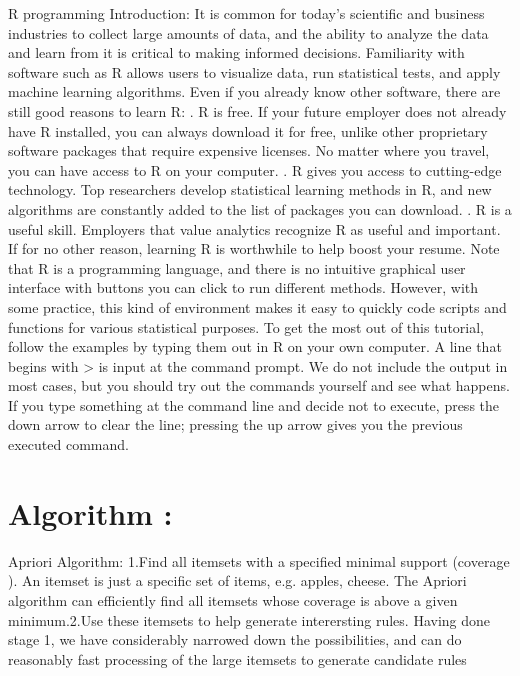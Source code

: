 \documentclass[10pt,a4paper]{article}
\begin{document}
{{R programming Introduction:
\newline
It is common for today's scientific and business industries to collect large amounts of data, and the ability to
analyze the data and learn from it is critical to making informed decisions. Familiarity with software such as R
allows users to visualize data, run statistical tests, and apply machine learning algorithms. Even if you already
know other software, there are still good reasons to learn R:
.	 R is free. If your future employer does not already have R installed, you can always download it for free,
unlike other proprietary software packages that require expensive licenses. No matter where you travel, you
can have access to R on your computer.
.	 R gives you access to cutting-edge technology. Top researchers develop statistical learning methods
in R, and new algorithms are constantly added to the list of packages you can download.
.	 R is a useful skill. Employers that value analytics recognize R as useful and important. If for no other
reason, learning R is worthwhile to help boost your resume.
\newline
Note that R is a programming language, and there is no intuitive graphical user interface with buttons you can
\newline
click to run different methods. However, with some practice, this kind of environment makes it easy to quickly
code scripts and functions for various statistical purposes. To get the most out of this tutorial, follow the examples
by typing them out in R on your own computer. A line that begins with > is input at the command prompt. We
do not include the output in most cases, but you should try out the commands yourself and see what happens.
If you type something at the command line and decide not to execute, press the down arrow to clear the line;
pressing the up arrow gives you the previous executed command.

\section{Algorithm : }

Apriori Algorithm:
\newline
1.Find all itemsets with a specified minimal support  (coverage ).  An itemset is just a specific set of items, e.g. {apples, cheese}. The Apriori algorithm can efficiently find all itemsets whose coverage is above a given minimum.2.Use these itemsets to help generate interersting rules. Having done stage 1, we have considerably narrowed down the possibilities, and can do reasonably fast processing of the large itemsets to generate candidate rules


}}
\end{document}
